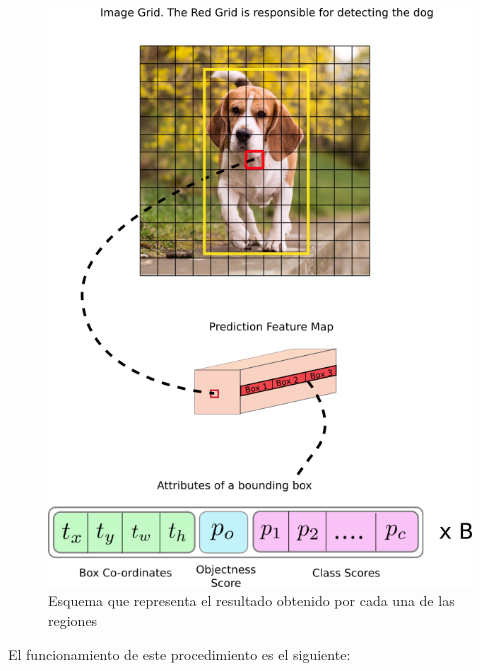 \documentclass[a4paper]{article}
\begin{document}
\begin{figure}[ht]
    \centering
    \includegraphics[scale=0.3]{images/yolo-1.png}
    \caption{Esquema que representa el resultado obtenido por cada una de las regiones}
    \label{fig:my_label}
\end{figure}

El funcionamiento de este procedimiento es el siguiente:
\end{document}
